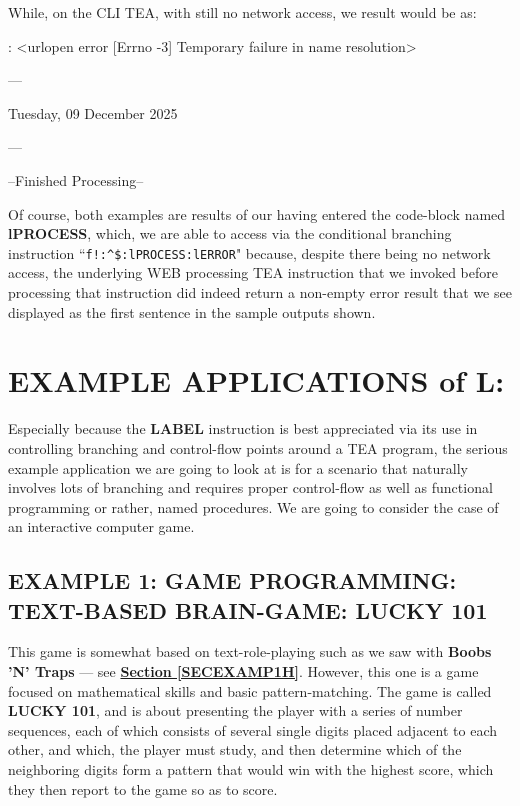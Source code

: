 \documentclass[a4paper, 18pt]{book} %
\begin{document}
While, on the CLI TEA, with still no network access, we result would be as:


  \begin{tcbverbatim}[title=Example 1: Sample Output ]
[ERROR]: <urlopen error [Errno -3] Temporary failure in name resolution>

---

Tuesday, 09 December 2025

---

--Finished Processing--
  \end{tcbverbatim}



Of course, both examples are results of our having entered the code-block named \textbf{lPROCESS}, which, we are able to access via the conditional branching instruction ``\verb|f!:^$:lPROCESS:lERROR|" because, despite there being no network access, the underlying WEB processing TEA instruction that we invoked before processing that instruction did indeed return a non-empty error result that we see displayed as the first sentence in the sample outputs shown.




\section{EXAMPLE APPLICATIONS of L:}
\label{SECEXAMPL}

  
Especially because the \textbf{LABEL} instruction is best appreciated via its use in controlling branching and control-flow points around a TEA program, the serious example application we are going to look at is for a scenario that naturally involves lots of branching and requires proper control-flow as well as functional programming or rather, named procedures. We are going to consider the case of an interactive computer game.



\subsection{EXAMPLE 1: \textbf{GAME PROGRAMMING:} TEXT-BASED BRAIN-GAME: LUCKY 101}
\label{SECEXAMP1L}


This game is somewhat based on text-role-playing such as we saw with \textbf{Boobs 'N' Traps} --- see  \textbf{\hyperref[SECEXAMP1H]{Section \ref{SECEXAMP1H}}}. However, this one is a game focused on mathematical skills and basic pattern-matching. The game is called \textbf{LUCKY 101}, and is about presenting the player with a series of number sequences, each of which consists of several single digits placed adjacent to each other, and which, the player must study, and then determine which of the neighboring digits form a pattern that would win with the highest score, which they then report to the game so as to score.
\end{document}
